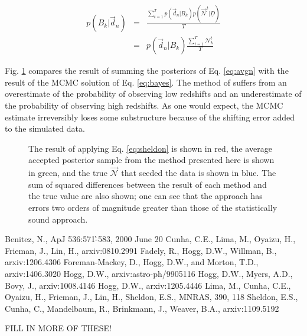 \documentclass[12pt, onecolumn]{emulateapj}
\newcommand{\textul}{\underline}
\begin{document}
\begin{eqnarray}
\label{eq:avgn}
p(B_{k}|\vec{d}_{n}) &=& \frac{\sum_{t=1}^{T} p(\vec{d}_{n}|B_{k})p(\vec{\mathcal{N}}^{t}|\textul{D})}{T}\\
&=& p(\vec{d}_{n}|B_{k})\frac{\sum_{t=1}^{T}\mathcal{N}_{k}^{t}}{T}\nonumber
\end{eqnarray}

Fig. \ref{fig:sheldon} compares the result of summing the posteriors of Eq. \ref{eq:avgn} with the result of the MCMC solution of Eq. \ref{eq:bayes}.  The method of \citet{she11} suffers from an overestimate of the probability of observing low redshifts and an underestimate of the probability of observing high redshifts.  As one would expect, the MCMC estimate irreversibly loses some substructure because of the shifting error added to the simulated data.

\begin{figure}
\label{fig:sheldon}
\caption{The result of applying Eq. \ref{eq:sheldon} is shown in red, the average accepted posterior sample from the method presented here is shown in green, and the true $\vec{\mathcal{N}}$ that seeded the data is shown in blue.  The sum of squared differences between the result of each method and the true value are also shown; one can see that the \citet{she11} approach has errors two orders of magnitude greater than those of the statistically sound approach.}
\end{figure}



\begin{thebibliography}{}
Benitez, N., ApJ 536:571-̀583, 2000 June 20
Cunha, C.E., Lima, M., Oyaizu, H., Frieman, J., Lin, H., arxiv:0810.2991
Fadely, R., Hogg, D.W., Willman, B., arxiv:1206.4306
Foreman-Mackey, D., Hogg, D.W., and Morton, T.D., arxiv:1406.3020
Hogg, D.W., arxiv:astro-ph/9905116
Hogg, D.W., Myers, A.D., Bovy, J., arxiv:1008.4146
Hogg, D.W., arxiv:1205.4446
Lima, M., Cunha, C.E., Oyaizu, H., Frieman, J., Lin, H., Sheldon, E.S., MNRAS, 390, 118
Sheldon, E.S., Cunha, C., Mandelbaum, R., Brinkmann, J., Weaver, B.A., arxiv:1109.5192

FILL IN MORE OF THESE!
\end{thebibliography}
\end{document}
